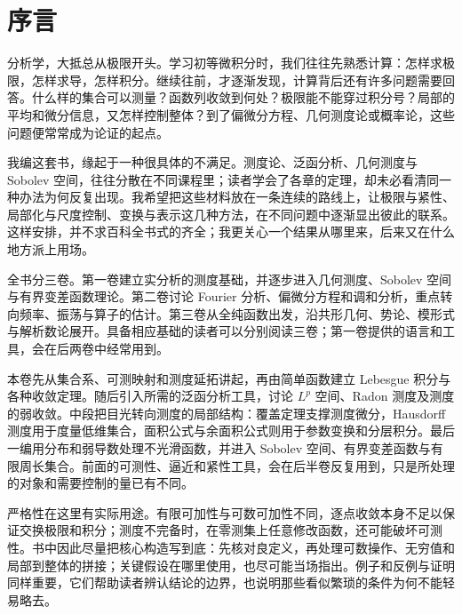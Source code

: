 \chapter*{序言}

分析学，大抵总从极限开头。学习初等微积分时，我们往往先熟悉计算：怎样求极限，怎样求导，怎样积分。继续往前，才逐渐发现，计算背后还有许多问题需要回答。什么样的集合可以测量？函数列收敛到何处？极限能不能穿过积分号？局部的平均和微分信息，又怎样控制整体？到了偏微分方程、几何测度论或概率论，这些问题便常常成为论证的起点。

\ProseParagraphBreak

我编这套书，缘起于一种很具体的不满足。测度论、泛函分析、几何测度与 Sobolev 空间，往往分散在不同课程里；读者学会了各章的定理，却未必看清同一种办法为何反复出现。我希望把这些材料放在一条连续的路线上，让极限与紧性、局部化与尺度控制、变换与表示这几种方法，在不同问题中逐渐显出彼此的联系。这样安排，并不求百科全书式的齐全；我更关心一个结果从哪里来，后来又在什么地方派上用场。

\ProseParagraphBreak

全书分三卷。第一卷建立实分析的测度基础，并逐步进入几何测度、Sobolev 空间与有界变差函数理论。第二卷讨论 Fourier 分析、偏微分方程和调和分析，重点转向频率、振荡与算子的估计。第三卷从全纯函数出发，沿共形几何、势论、模形式与解析数论展开。具备相应基础的读者可以分别阅读三卷；第一卷提供的语言和工具，会在后两卷中经常用到。

\ProseParagraphBreak

本卷先从集合系、可测映射和测度延拓讲起，再由简单函数建立 Lebesgue 积分与各种收敛定理。随后引入所需的泛函分析工具，讨论 \(L^p\) 空间、Radon 测度及测度的弱收敛。中段把目光转向测度的局部结构：覆盖定理支撑测度微分，Hausdorff 测度用于度量低维集合，面积公式与余面积公式则用于参数变换和分层积分。最后一编用分布和弱导数处理不光滑函数，并进入 Sobolev 空间、有界变差函数与有限周长集合。前面的可测性、逼近和紧性工具，会在后半卷反复用到，只是所处理的对象和需要控制的量已有不同。

\ProseParagraphBreak

严格性在这里有实际用途。有限可加性与可数可加性不同，逐点收敛本身不足以保证交换极限和积分；测度不完备时，在零测集上任意修改函数，还可能破坏可测性。书中因此尽量把核心构造写到底：先核对良定义，再处理可数操作、无穷值和局部到整体的拼接；关键假设在哪里使用，也尽可能当场指出。例子和反例与证明同样重要，它们帮助读者辨认结论的边界，也说明那些看似繁琐的条件为何不能轻易略去。

\ProseParagraphBreak

